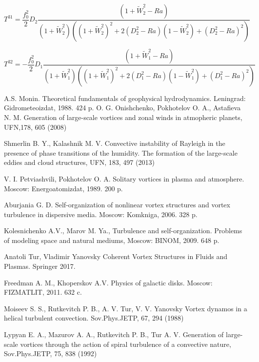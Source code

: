 \documentclass [12pt]{article}
\begin{document}
\begin{equation}\label{eqIII6}
T^{31}  = \frac{{f_0^2 }}{2}D_2 \frac{{(1 + \widetilde W_2^2  - Ra)}}{{(1 + \widetilde W_2^2 )((1 + \widetilde W_2^2 )^2  + 2(D_2^2  - Ra)(1 - \widetilde W_2^2 ) + (D_2^2  - Ra)^2 )}} \end{equation}

\begin{equation}\label{eqIII7}
T^{32}  = -\frac{{f_0^2 }}{2}D_1 \frac{{(1 + \widetilde W_1^2  - Ra)}}{{(1 + \widetilde W_1^2 )((1 + \widetilde W_1^2 )^2  + 2(D_1^2  - Ra)(1 - \widetilde W_1^2 ) + (D_1^2  - Ra)^2 )}} \end{equation}



\begin{thebibliography}{21}

 A.S. Monin. Theoretical fundamentals of geophysical hydrodynamics. Leningrad: Gidrometeoizdat, 1988. 424 p.
 O. G. Onishchenko, Pokhotelov O. A.,  Astafieva N. M. Generation of large-scale vortices and zonal winds in atmopheric planets, UFN,178, 605 (2008)

 Shmerlin B. Y., Kalashnik M. V. Convective instability of Rayleigh in the presence of phase transitions of the humidity. The formation of the large-scale eddies and cloud structures, UFN, 183, 497 (2013)

 V. I. Petviashvili, Pokhotelov O. A. Solitary vortices in plasma and atmosphere. Moscow: Energoatomizdat, 1989. 200 p.

 Aburjania G. D. Self-organization of nonlinear vortex structures and vortex turbulence in dispersive media. Moscow: Komkniga, 2006. 328 p.

 Kolesnichenko  A.V., Marov  M. Ya., Turbulence and self-organization. Problems of modeling space and natural mediums, Moscow: BINOM, 2009. 648 p.

 Anatoli Tur, Vladimir Yanovsky  Coherent Vortex Structures in Fluids and Plasmas. Springer 2017.

 Freedman A. M., Khoperskov A.V. Physics of galactic disks. Moscow: FIZMATLIT, 2011. 632 c.

 Moiseev S. S., Rutkevitch  P. B., A. V. Tur, V. V. Yanovsky Vortex dynamos in a helical turbulent convection. Sov.Phys.JETP, 67, 294 (1988)

 Lypyan E. A., Mazurov A. A., Rutkevitch P. B., Tur A. V. Generation of large-scale vortices through the action of spiral turbulence of a convective nature, Sov.Phys.JETP, 75, 838 (1992)


\end{thebibliography}
\end{document}
